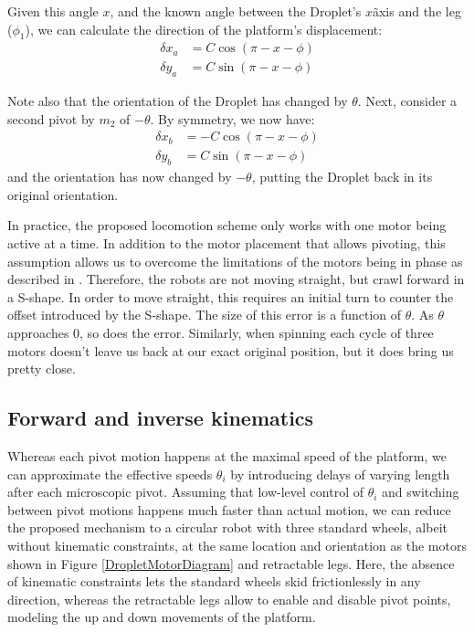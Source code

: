 \documentclass[letterpaper, 10pt, conference]{ieeeconf}
\begin{document}
Given this angle $x$, and the known angle between the Droplet's $x$\~axis and the leg ($\phi_1$), we can calculate the direction of the platform's displacement:
%
\begin{align}
\delta x_a &= C \cos(\pi - x - \phi)\\
\nonumber
\delta y_a &= C \sin(\pi - x - \phi)
\end{align}

Note also that the orientation of the Droplet has changed by $\theta$. Next, consider a second pivot by $m_2$ of $-\theta$. By symmetry, we now have:
%
\begin{align}
\delta x_b &= -C\cos(\pi -x -\phi)\\
\nonumber
\delta y_b &= C \sin(\pi - x - \phi)
\end{align}
%
and the orientation has now changed by $-\theta$, putting the Droplet back in its original orientation. 

In practice, the proposed locomotion scheme only works with one motor being active at a time. In addition to the motor placement that allows pivoting, this assumption allows us to overcome the limitations of the motors being in phase as described in \cite{Vartholomeos2005}. Therefore, the robots are not moving straight, but crawl forward in a S-shape. In order to move straight, this requires an initial turn to counter the offset introduced by the S-shape. The size of this error is a function of $\theta$. As $\theta$ approaches $0$, so does the error. Similarly, when spinning each cycle of three motors doesn't leave us back at our exact original position, but it does bring us pretty close.



\subsection{Forward and inverse kinematics}
Whereas each pivot motion happens at the maximal speed of the platform, we can approximate the effective speeds $\theta_i$ by introducing delays of varying length after each microscopic pivot. Assuming that low-level control of $\theta_i$ and switching between pivot motions happens much faster than actual motion, we can reduce the proposed mechanism to a circular robot with three standard wheels, albeit without kinematic constraints, at the same location and orientation as the motors shown in Figure \ref{DropletMotorDiagram} and retractable legs. Here, the absence of kinematic constraints lets the standard wheels skid frictionlessly in any direction, whereas the retractable legs allow to enable and disable pivot points, modeling the up and down movements of the platform. 
\end{document}

